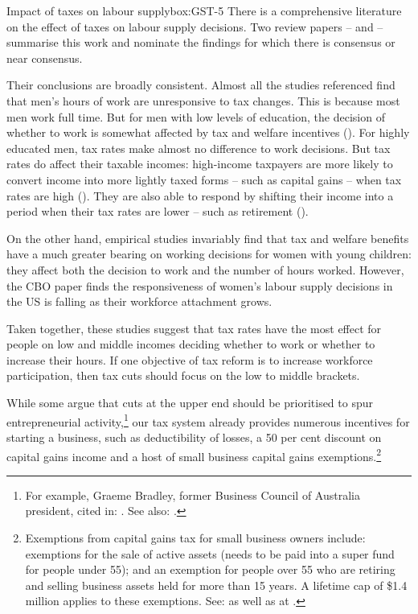 \begin{smallbox}{Impact of taxes on labour supply}{box:GST-5}
There is a comprehensive literature on the effect of taxes on labour supply decisions. Two review papers – \textcite{MeghirPhillips2008} and \textcite{CBO-2012-Labor-Supply-Elasticity} \textcite{CBO-2012-Labor-Supply-Elasticity} – summarise this work and nominate the findings for which there is consensus or near consensus.

Their conclusions are broadly consistent. Almost all the studies referenced find that men’s hours of work are unresponsive to tax changes. This is because most men work full time. But for men with low levels of education, the decision of whether to work is somewhat affected by tax and welfare incentives (\textcite{MeghirPhillips2008}). For highly educated men, tax rates make almost no difference to work decisions. But tax rates do affect their taxable incomes: high-income taxpayers are more likely to convert income into more lightly taxed forms – such as capital gains – when tax rates are high (\textcite{MeghirPhillips2008}). They are also able to respond by shifting their income into a period when their tax rates are lower – such as retirement (\textcite{CBO-2012-Labor-Supply-Elasticity}).

On the other hand, empirical studies invariably find that tax and welfare benefits have a much greater bearing on working decisions for women with young children: they affect both the decision to work and the number of hours worked. However, the CBO paper finds the responsiveness of women’s labour supply decisions in the US is falling as their workforce attachment grows.

Taken together, these studies suggest that tax rates have the most effect for people on low and middle incomes deciding whether to work or whether to increase their hours. If one objective of tax reform is to increase workforce participation, then tax cuts should focus on the low to middle brackets.

\end{smallbox}


While some argue that cuts at the upper end should be prioritised to spur entrepreneurial activity,\footnote{For example, Graeme Bradley, former Business Council of Australia president, cited in: \textcite{BaloghHepworth2015}. See also: \textcite{Hockey2015d}.}  our tax system already provides numerous incentives for starting a business, such as deductibility of losses, a 50 per cent discount on capital gains income and a host of small business capital gains exemptions.\footnote{Exemptions from capital gains tax for small business owners include: 
 exemptions for the sale of active assets (needs to be paid into a super fund for people under 55); and an exemption for people over 55 who are retiring and selling business assets held for more than 15 years. A lifetime cap of \$1.4 million applies to these exemptions. See: \textcite{ATO2014f} as well as  at \pageref{paragraph:SUPER-lifetime-CGT-cap}.
}  

